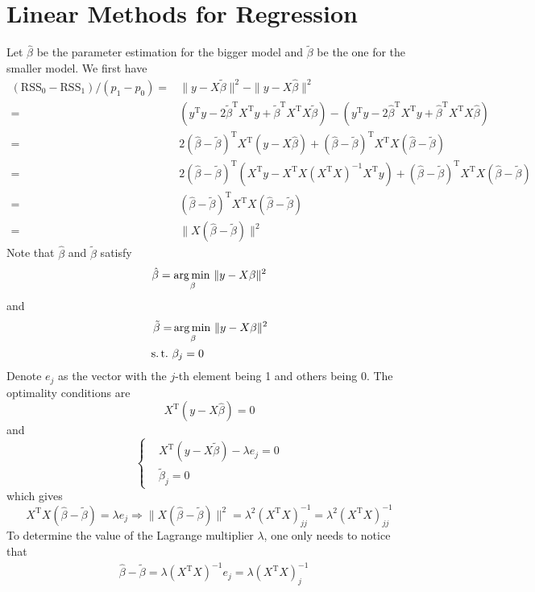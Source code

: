 \section{Linear Methods for Regression}

\begin{sol}
\label{3.1}
Let $\hat{\beta}$ be the parameter estimation for the bigger model and $\tilde{\beta}$ be the one for the smaller model. We first have
\begin{align*}
(\mathrm{RSS}_0-\mathrm{RSS}_1)/(p_1-p_0) = & \|y-X\tilde{\beta}\|^2 - \|y-X\hat{\beta}\|^2 \\
=& (y^\mathrm{T}y-2\tilde{\beta}^\mathrm{T}X^\mathrm{T}y+\tilde{\beta}^\mathrm{T}X^\mathrm{T}X\tilde{\beta}) - (y^\mathrm{T}y-2\hat{\beta}^\mathrm{T}X^\mathrm{T}y+\hat{\beta}^\mathrm{T}X^\mathrm{T}X\hat{\beta}) \\
=& 2(\hat{\beta}-\tilde{\beta})^\mathrm{T}X^\mathrm{T}(y-X\hat{\beta}) + (\hat{\beta}-\tilde{\beta})^\mathrm{T}X^\mathrm{T}X (\hat{\beta}-\tilde{\beta}) \\
=& 2(\hat{\beta}-\tilde{\beta})^\mathrm{T}(X^\mathrm{T}y-X^\mathrm{T}X(X^\mathrm{T}X)^{-1}X^\mathrm{T}y) + (\hat{\beta}-\tilde{\beta})^\mathrm{T}X^\mathrm{T}X (\hat{\beta}-\tilde{\beta}) \\
=& (\hat{\beta}-\tilde{\beta})^\mathrm{T}X^\mathrm{T}X (\hat{\beta}-\tilde{\beta})\\
=& \|X (\hat{\beta}-\tilde{\beta})\|^2
\end{align*}
Note that $\hat{\beta}$ and $\tilde{\beta}$ satisfy
\[
\hat{\beta}=\operatorname*{arg\,min\,}_\beta\|y-X\beta\|^2
\]
and
\begin{align*}
\tilde{\beta}=&\argmin_\beta\|y-X\beta\|^2\\
\st &\beta_j=0
\end{align*}
Denote $e_j$ as the vector with the $j$-th element being 1 and others being 0. The optimality conditions are
\[
X^\mathrm{T}(y-X\hat{\beta})=0
\]
and
\[
\begin{cases}
& X^\mathrm{T}(y-X\tilde{\beta})-\lambda e_j=0\\
& \tilde{\beta}_j=0
\end{cases}
\]
which gives
\[
X^\mathrm{T}X (\hat{\beta}-\tilde{\beta}) = \lambda e_j \Longrightarrow \|X (\hat{\beta}-\tilde{\beta})\|^2 = \lambda^2 (X^\mathrm{T}X)^{-1}_{jj} = \lambda^2 (X^\mathrm{T}X)^{-1}_{jj}
\]
To determine the value of the Lagrange multiplier $\lambda$, one only needs to notice that
\begin{align*}
&\hat{\beta}-\tilde{\beta} = \lambda (X^\mathrm{T}X)^{-1} e_j = \lambda (X^\mathrm{T}X)^{-1}_j \\

\end{align*}
\end{sol}
